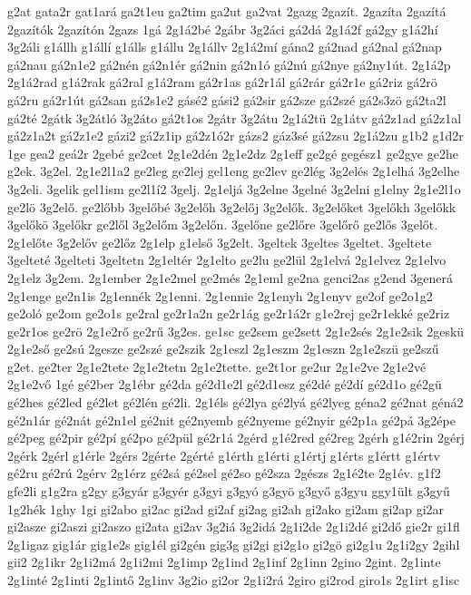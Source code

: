 {g2at
gata2r
gat1ará
ga2t1eu
ga2tim
ga2ut
ga2vat
2gazg
2gazít.
2gazíta
2gazítá
2gazítók
2gazítón
2gazs
1gá
2g1á2bé
2gábr
3g2áci
gá2dá
2g1á2f
gá2gy
g1á2hí
3g2áli
g1állh
g1állí
g1álls
g1állu
2g1állv
2g1á2mí
gána2
gá2nad
gá2nal
gá2nap
gá2nau
gá2n1e2
gá2nén
gá2n1ér
gá2nin
gá2n1ó
gá2nú
gá2nye
gá2ny1út.
2g1á2p
2g1á2rad
g1á2rak
gá2ral
g1á2ram
gá2r1as
gá2r1ál
gá2rár
gá2r1e
gá2riz
gá2rö
gá2ru
gá2r1út
gá2san
gá2s1e2
gásé2
gási2
gá2sir
gá2sze
gá2szé
gá2s3zö
gá2ta2l
gá2té
2gátk
3g2átló
3g2áto
gá2t1os
2gátr
3g2átu
2g1á2tü
2g1átv
gá2z1ad
gá2z1al
gá2z1a2t
gá2z1e2
gázi2
gá2z1ip
gá2z1ó2r
gázs2
gáz3sé
gá2zsu
2g1á2zu
g1b2
g1d2r
1ge
gea2
geá2r
2gebé
ge2cet
2g1e2dén
2g1e2dz
2g1eff
ge2gé
gegész1
ge2gye
ge2he
g2ek.
3g2el.
2g1e2l1a2
ge2leg
ge2lej
gel1eng
ge2lev
ge2lég
3g2elés
2g1elhá
3g2elhe
3g2eli.
3gelik
gel1ism
ge2l1í2
3gelj.
2g1eljá
3g2elne
3gelné
3g2elni
g1elny
2g1e2l1o
ge2lö
3g2elő.
ge2lőbb
3gelőbé
3g2előh
3g2előj
3g2elők.
3g2előket
3gelőkh
3gelőkk
3gelőkö
3gelőkr
ge2lől
3g2előm
3g2előn.
3gelőne
ge2lőre
3gelőrő
ge2lős
3gelőt.
2g1előte
3g2előv
ge2lőz
2g1elp
g1első
3g2elt.
3geltek
3geltes
3geltet.
3geltete
3gelteté
3gelteti
3geltetn
2g1eltér
2g1elto
ge2lu
ge2lül
2g1elvá
2g1elvez
2g1elvo
2g1elz
3g2em.
2g1ember
2g1e2mel
ge2més
2g1eml
ge2na
genci2as
g2end
3generá
2g1enge
ge2n1is
2g1ennék
2g1enni.
2g1ennie
2g1enyh
2g1enyv
ge2of
ge2o1g2
ge2oló
ge2om
ge2o1s
ge2ral
ge2r1a2n
ge2r1ág
ge2r1á2r
g1e2rej
ge2r1ekké
ge2riz
ge2r1os
ge2rö
2g1e2rő
ge2rű
3g2es.
ge1sc
ge2sem
ge2sett
2g1e2sés
2g1e2sik
2geskü
2g1e2ső
ge2sú
2gesze
ge2szé
ge2szik
2g1eszl
2g1eszm
2g1eszn
2g1e2szü
ge2szű
g2et.
ge2ter
2g1e2tete
2g1e2tetn
2g1e2tette.
ge2t1or
ge2ur
2g1e2ve
2g1e2vé
2g1e2vő
1gé
gé2ber
2g1ébr
gé2da
gé2d1e2l
gé2d1esz
gé2dé
gé2dí
gé2d1o
gé2gü
gé2hes
gé2led
gé2let
gé2lén
gé2li.
2g1éls
gé2lya
gé2lyá
gé2lyeg
géna2
gé2nat
géná2
gé2n1ár
gé2nát
gé2n1el
gé2nit
gé2nyemb
gé2nyeme
gé2nyir
gé2p1a
gé2pá
3g2épe
gé2peg
gé2pir
gé2pí
gé2po
gé2pül
gé2r1á
2gérd
g1é2red
gé2reg
2gérh
g1é2rin
2gérj
2gérk
2gérl
g1érle
2gérs
2gérte
2gérté
g1érth
g1érti
g1értj
g1érts
g1értt
g1értv
gé2ru
gé2rú
2gérv
2g1érz
gé2sá
gé2sel
gé2so
gé2sza
2gészs
2g1é2te
2g1év.
g1f2
gfe2li
g1g2ra
g2gy
g3gyár
g3gyér
g3gyi
g3gyó
g3gyö
g3győ
g3gyu
ggy1ült
g3gyű
1g2hék
1ghy
1gi
gi2abo
gi2ac
gi2ad
gi2af
gi2ag
gi2ah
gi2ako
gi2am
gi2ap
gi2ar
gi2asze
gi2aszi
gi2aszo
gi2ata
gi2av
3g2iá
3g2idá
2g1i2de
2g1i2dé
gi2dő
gie2r
gi1fl
2g1igaz
gig1ár
gig1e2s
gig1él
gi2gén
gig3g
gi2gi
gi2g1o
gi2gö
gi2g1u
2g1i2gy
2gihl
gii2
2g1ikr
2g1i2má
2g1i2mi
2g1imp
2g1ind
2g1inf
2g1inn
2gino
2gint.
2g1inte
2g1inté
2g1inti
2g1intő
2g1inv
3g2io
gi2or
2g1i2rá
2giro
gi2rod
giro1s
2g1irt
g1isc
}
